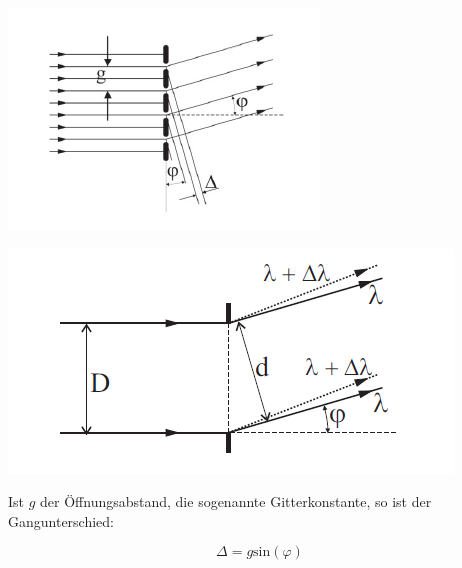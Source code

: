 \documentclass[11pt,ngerman]{scrartcl}
\begin{document}
\begin{minipage}{\textwidth}
	\begin{minipage}[t]{0.5\textwidth}
		\centering
		\includegraphics[width=\textwidth]{abb1}
		\label{fig:abb1}
	\end{minipage}
	\vspace{2mm}
	\begin{minipage}[t]{0.50\textwidth}
		\centering
		\includegraphics[width=\textwidth]{abb2}
		\label{fig:abb2}
	\end{minipage}
	\vspace{1em}
\end{minipage}

Ist $g$ der Öffnungsabstand, die sogenannte Gitterkonstante, so ist der Gangunterschied:

\begin{equation}
	\Delta = g \textrm{sin}(\varphi)
\end{equation}
\end{document}
